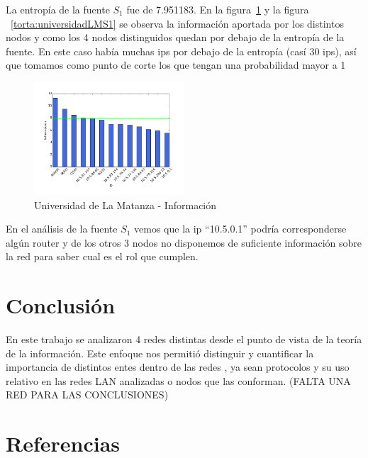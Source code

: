\documentclass[final,inline,narroweqnarray,a4paper]{ieee}
\begin{document}
La entropía de la fuente $S_1$ fue de 7.951183. En la figura~\ref{histo:universidadLMS1} y la figura ~\ref{torta:universidadLMS1} se observa la información aportada por los distintos nodos y como los 4 nodos distinguidos quedan por debajo de la entropía de la fuente. En este caso había muchas ips por debajo de la entropía (casí 30 ips), así que tomamos como punto de corte los que tengan una probabilidad mayor a 1%

\begin{figure}[H]
    \begin{center}
        \includegraphics[width=0.5\textwidth]{plot/facultadS1_v3-bar.png}
        \caption{Universidad de La Matanza - Información}
        \label{histo:universidadLMS1}
    \end{center}
\end{figure}

En el análisis de la fuente $S_1$ vemos que la ip ``10.5.0.1'' podría corresponderse algún router y de los otros 3 nodos no disponemos de suficiente información sobre la red para saber cual es el rol que cumplen.

\section{Conclusión}
En este trabajo se analizaron 4 redes distintas desde el punto de vista de la teoría de la información. Este enfoque nos permitió distinguir y cuantificar la importancia de distintos entes dentro de las redes , ya sean protocolos y su uso relativo en las redes LAN analizadas o nodos que las conforman. (FALTA UNA RED PARA LAS CONCLUSIONES)


\section{Referencias}
\end{document}
